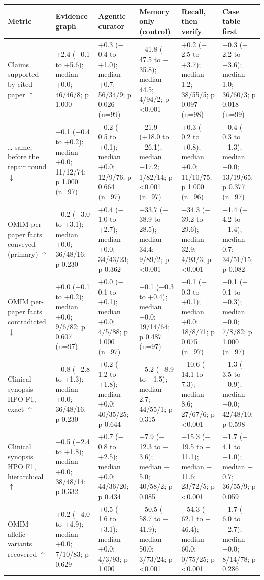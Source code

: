\documentclass{article} %
\begin{document}
\begin{table}[!htbp]
\begin{tabularx}{\linewidth}{>{\raggedright\arraybackslash}p{2.2cm}>{\centering\arraybackslash}X>{\centering\arraybackslash}X>{\centering\arraybackslash}X>{\centering\arraybackslash}X>{\centering\arraybackslash}X}
\toprule
Metric & Evidence graph & Agentic curator & Memory only (control) & Recall, then verify & Case table first \\
\midrule
Claims supported by cited paper $\uparrow$ & +2.4 (+0.1 to +5.6); median +0.0; 46/46/8; p 1.000 & +0.3 ($-$0.4 to +1.0); median +0.7; 56/34/9; p 0.026 (n=99) & $-$41.8 ($-$47.5 to $-$35.8); median $-$44.5; 4/94/2; p <0.001 & +0.2 ($-$2.5 to +3.7); median $-$1.2; 38/55/5; p 0.097 (n=98) & +0.3 ($-$2.2 to +3.6); median $-$1.0; 36/60/3; p 0.018 (n=99) \\
\ldots{} same, before the repair round $\downarrow$ & $-$0.1 ($-$0.4 to +0.2); median +0.0; 11/12/74; p 1.000 (n=97) & $-$0.2 ($-$0.5 to +0.1); median +0.0; 12/9/76; p 0.664 (n=97) & +21.9 (+18.0 to +26.1); median +17.2; 1/82/14; p <0.001 (n=97) & +0.3 ($-$0.2 to +0.8); median +0.0; 11/10/75; p 1.000 (n=96) & +0.4 ($-$0.3 to +1.3); median +0.0; 13/19/65; p 0.377 (n=97) \\
OMIM per-paper facts conveyed (primary) $\uparrow$ & $-$0.2 ($-$3.0 to +3.1); median +0.0; 36/48/16; p 0.230 & +0.4 ($-$1.0 to +2.7); median +0.0; 34/43/23; p 0.362 & $-$33.7 ($-$38.9 to $-$28.5); median $-$34.4; 9/89/2; p <0.001 & $-$34.3 ($-$39.2 to $-$29.6); median $-$32.9; 4/93/3; p <0.001 & $-$1.4 ($-$4.2 to +1.4); median $-$0.7; 34/51/15; p 0.082 \\
OMIM per-paper facts contradicted $\downarrow$ & +0.0 ($-$0.1 to +0.2); median +0.0; 9/6/82; p 0.607 (n=97) & +0.0 ($-$0.1 to +0.1); median +0.0; 4/5/88; p 1.000 (n=97) & +0.1 ($-$0.3 to +0.4); median +0.0; 19/14/64; p 0.487 (n=97) & $-$0.1 ($-$0.3 to +0.1); median +0.0; 18/8/71; p 0.075 (n=97) & +0.1 ($-$0.1 to +0.3); median +0.0; 7/8/82; p 1.000 (n=97) \\
Clinical synopsis HPO F1, exact $\uparrow$ & $-$0.8 ($-$2.8 to +1.3); median +0.0; 36/48/16; p 0.230 & +0.2 ($-$1.2 to +1.8); median +0.0; 40/35/25; p 0.644 & $-$5.2 ($-$8.9 to $-$1.5); median $-$2.7; 44/55/1; p 0.315 & $-$10.6 ($-$14.1 to $-$7.3); median $-$8.6; 27/67/6; p <0.001 & $-$1.3 ($-$3.5 to +0.9); median +0.0; 42/48/10; p 0.598 \\
Clinical synopsis HPO F1, hierarchical $\uparrow$ & $-$0.5 ($-$2.4 to +1.8); median +0.0; 38/48/14; p 0.332 & +0.7 ($-$0.8 to +2.5); median +0.0; 44/36/20; p 0.434 & $-$7.9 ($-$12.3 to $-$3.6); median $-$5.0; 40/58/2; p 0.085 & $-$15.3 ($-$19.5 to $-$11.1); median $-$11.6; 23/72/5; p <0.001 & $-$1.7 ($-$4.1 to +1.0); median $-$0.7; 36/55/9; p 0.059 \\
OMIM allelic variants recovered $\uparrow$ & +0.2 ($-$4.0 to +4.9); median +0.0; 7/10/83; p 0.629 & +0.5 ($-$1.6 to +3.1); median +0.0; 4/3/93; p 1.000 & $-$50.5 ($-$58.7 to $-$41.9); median $-$50.0; 3/73/24; p <0.001 & $-$54.3 ($-$62.1 to $-$46.4); median $-$60.0; 0/75/25; p <0.001 & $-$1.7 ($-$6.0 to +2.7); median +0.0; 8/14/78; p 0.286 \\

\end{tabularx}
\end{table}
\end{document}
